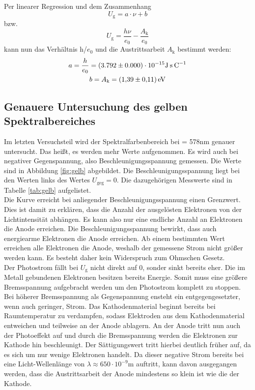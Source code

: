 Per linearer Regression und dem Zusammenhang 
\begin{equation*}
	U_\text{g} = a \cdot \nu + b
\end{equation*}
bzw.
\begin{equation*}
	U_\text{g} = \frac{h\nu}{e_0} - \frac{A_\text{k}}{e_0}
\end{equation*}
kann nun das Verhältnis h/$e_0$ und die Austrittsarbeit $A_\text{k}$ bestimmt werden:
\begin{gather*}
	a = \frac{h}{e_0} = (3.792 \pm 0.000) \cdot 10^{-15} \text{J}\: \text{s}\: \text{C}^{-1}\\
	b = A_\text{k} = \SI{1.39 \pm 0.11}{eV}
\end{gather*}

\subsection{Genauere Untersuchung des gelben Spektralbereiches}

Im letzten Versuchsteil wird der Spektralfarbenbereich bei \lambda = 578nm genauer untersucht. Das heißt, es werden mehr Werte aufgenommen. Es wird auch bei negativer Gegenspannung, also Beschleunigungsspannung gemessen.
Die Werte sind in Abbildung \ref{fig:gelb} abgebildet. Die Beschleunigungsspannung liegt bei den Werten links des Wertes $U_\text{geg} = 0$. Die dazugehörigen Messwerte sind in Tabelle \ref{tab:gelb} aufgelistet. \\
Die Kurve erreicht bei anliegender Beschleunigungsspannung einen Grenzwert. Dies ist damit zu erklären, dass die Anzahl der ausgelösten Elektronen von der Lichtintensität abhängen. Es kann also nur eine endliche Anzahl an Elektronen die Anode erreichen. Die Beschleunigungsspannung bewirkt, dass auch energiearme Elektronen die Anode erreichen. Ab einem bestimmten Wert erreichen alle Elektronen die Anode, weshalb der gemessene Strom nicht größer werden kann. Es besteht daher kein Widerspruch zum Ohmschen Gesetz. \\

Der Photostrom fällt bei $U_\text{g}$ nicht direkt auf 0, sonder sinkt bereits eher. Die im Metall gebundenen Elektronen besitzen bereits Energie. Somit muss eine größere Bremsspannung aufgebracht werden um den Photostrom komplett zu stoppen. \\

Bei höherer Bremsspannung als Gegenspannung ensteht ein entgegengesetzter, wenn auch geringer, Strom. 
Das Kathodenmaterial beginnt bereits bei Raumtemperatur zu verdampfen, sodass Elektroden aus dem Kathodenmaterial entweichen und teilweise an der Anode ablagern. An der Anode tritt nun auch der Photoeffekt auf und durch die Bremsspannung werden die Elektronen zur Kathode hin beschleunigt. Der Sättigungswert tritt hierbei deutlich früher auf, da es sich um nur wenige Elektronen handelt. Da dieser negative Strom bereits bei eine Licht-Wellenlänge von $\lambda \approx 650 \cdot 10^{-9} \text{m}$ auftritt, kann davon ausgegangen werden, dass die Austrittsarbeit der Anode mindestens so klein ist wie die der Kathode. 




